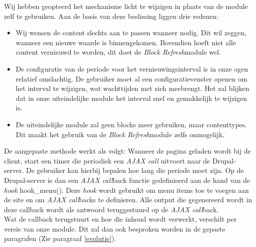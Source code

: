 Wij hebben geopteerd het mechanisme licht te wijzigen in plaats van de module zelf te gebruiken. Aan de basis van deze beslissing liggen drie redenen:
\begin{itemize}
\item Wij wensen de content slechts aan te passen wanneer nodig. Dit wil zeggen, wanneer een nieuwe waarde is binnengekomen. Bovendien hoeft niet alle content vernieuwd te worden, dit doet de \textit{Block Refresh}module wel.
\item De configuratie van de periode voor het vernieuwingsinterval is in onze ogen relatief omslachtig. De gebruiker moet al een configuratievenster openen om het interval te wijzigen, wat wachttijden met zich meebrengt. Het zal blijken dat in onze uiteindelijke module het interval snel en gemakkelijk te wijzigen is. 
\item De uiteindelijke module zal geen blocks meer gebruiken, maar contenttypes. Dit maakt het gebruik van de \textit{Block Refresh}module zelfs onmogelijk.
\end{itemize}

De aangepaste methode werkt als volgt: Wanneer de pagina geladen wordt bij de client, start een timer die periodiek een \textit{AJAX call} uitvoert naar de Drupal-server. De gebruiker kan hierbij bepalen hoe lang die periode moet zijn. Op de Drupal-server is dan een \textit{AJAX call}back functie gedefinieerd aan de hand van de \textit{hook} hook\_menu(). Deze \textit{hook} wordt gebruikt om menu items toe te voegen aan de site en om \textit{AJAX call}backs te definieren. Alle output die gegenereerd wordt in deze callback wordt als antwoord teruggestuurd op de \textit{AJAX call}back.\\

Wat de callback terugstuurt en hoe die inhoud wordt verwerkt, verschilt per versie van onze module. Dit zal dan ook besproken worden in de gepaste paragrafen (Zie paragraaf \ref{evolutie}).

